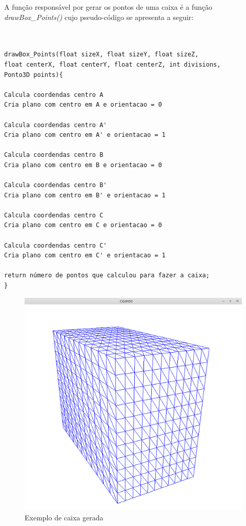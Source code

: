 \newpage


A função responsável por gerar os pontos de uma caixa é a função \textit{drawBox\_Points()} cujo pseudo-código se apresenta a seguir:

\begin{Verbatim}


drawBox_Points(float sizeX, float sizeY, float sizeZ, 
float centerX, float centerY, float centerZ, int divisions, 
Ponto3D points){

Calcula coordendas centro A
Cria plano com centro em A e orientacao = 0

Calcula coordendas centro A'
Cria plano com centro em A' e orientacao = 1

Calcula coordendas centro B
Cria plano com centro em B e orientacao = 0

Calcula coordendas centro B'
Cria plano com centro em B' e orientacao = 1

Calcula coordendas centro C
Cria plano com centro em C e orientacao = 0

Calcula coordendas centro C'
Cria plano com centro em C' e orientacao = 1

return número de pontos que calculou para fazer a caixa;
}

\end{Verbatim}

\begin{figure}[<+htpb+>]
	\centering
	\includegraphics[scale=0.5]{imagens/p3_caixa_10.png}
	\caption{Exemplo de caixa gerada}
	\label{p1:fig:p3_caixa_6_3_4}
\end{figure}



